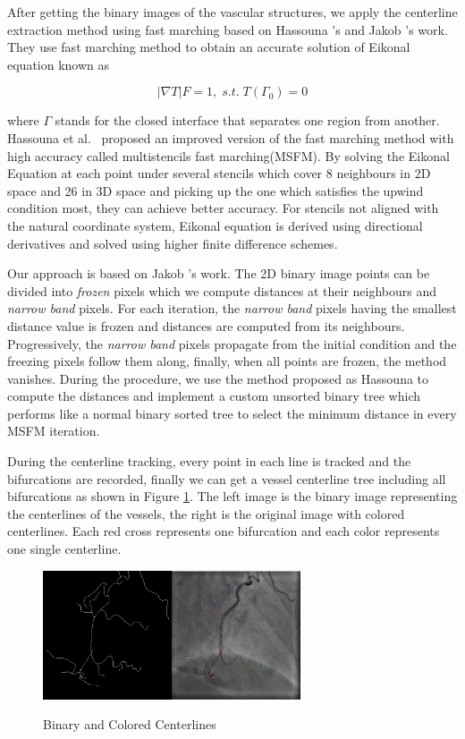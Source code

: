 After getting the binary images of the vascular structures, we apply
the centerline extraction method using fast marching based on Hassouna
\cite{Hassouna}'s and Jakob \cite{Jakob}'s  work. They use fast
marching method to obtain an accurate solution of Eikonal equation
known as

$$|\nabla T| F = 1 , \; s.t.\; T(\Gamma_{0})=0$$

where  $\Gamma$ stands for the closed interface that separates one region
from another. Hassouna et al.~\cite{Hassouna} proposed an improved version
of the fast marching method with high accuracy called multistencils fast
marching(MSFM). By solving the Eikonal Equation at each point under several
stencils which cover 8 neighbours in 2D space and 26 in 3D space and picking
up the one which satisfies the upwind condition most, they can achieve
better accuracy. For stencils not aligned with the natural coordinate
system, Eikonal equation is derived using directional derivatives and solved
using higher finite difference schemes.

Our approach is based on Jakob \cite{Jakob}'s  work. The 2D binary
image points can be divided into \textit{frozen} pixels which we
compute distances at their neighbours and \textit{narrow band} pixels.
For each iteration, the \textit{narrow band} pixels having the
smallest distance value is frozen and distances are computed from its
neighbours. Progressively, the \textit{narrow band} pixels propagate
from the initial condition and the freezing pixels follow them along,
finally, when all points are frozen, the method vanishes. During the
procedure, we use the method proposed as Hassouna \cite{Hassouna} to
compute the distances and implement a custom unsorted binary tree
which performs like a normal binary sorted tree to select the minimum
distance in every MSFM iteration.

During the centerline tracking, every point in each line is tracked and the
bifurcations are recorded, finally we can get a vessel centerline tree
including all bifurcations as shown in Figure \ref{fig:centerline}. The left
image is the binary image representing the centerlines of the vessels, the
right is the original image with colored centerlines. Each red cross
represents one bifurcation and each color represents one single centerline.

\begin{figure}
  \centering
  \includegraphics[width=3.0in]{centerline.png}\\
  \caption{Binary and Colored Centerlines}\label{fig:centerline}
\end{figure}
